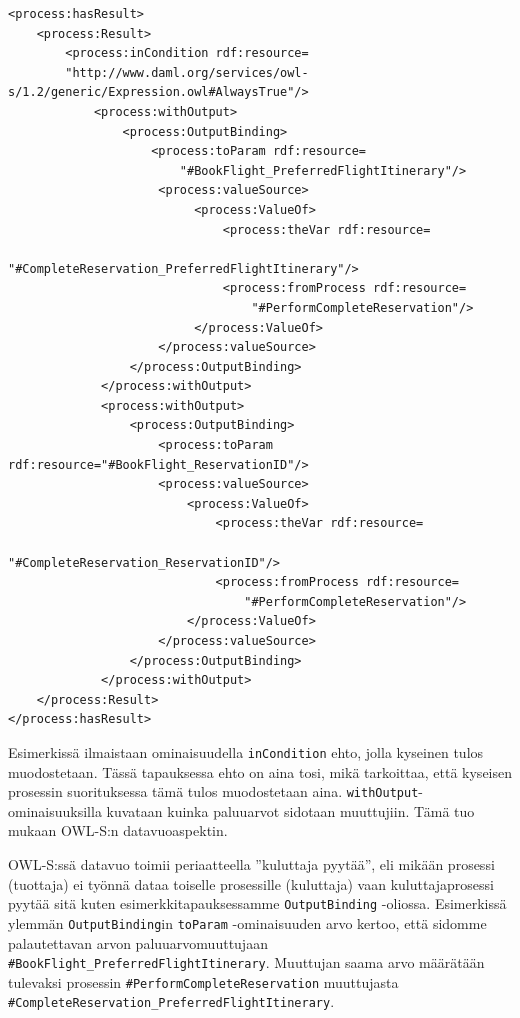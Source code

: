 \documentclass[finnish]{tktltiki2}
\theoremstyle{definition}
\theoremstyle{remark}
\begin{document}
\footnotesize
\begin{verbatim}
<process:hasResult>
    <process:Result>
        <process:inCondition rdf:resource=
        "http://www.daml.org/services/owl-s/1.2/generic/Expression.owl#AlwaysTrue"/>
            <process:withOutput>
                <process:OutputBinding>
                    <process:toParam rdf:resource=
                        "#BookFlight_PreferredFlightItinerary"/>
                     <process:valueSource>
                          <process:ValueOf>
                              <process:theVar rdf:resource=
                                  "#CompleteReservation_PreferredFlightItinerary"/>
                              <process:fromProcess rdf:resource=
                                  "#PerformCompleteReservation"/>
                          </process:ValueOf>
                     </process:valueSource>
                 </process:OutputBinding>
             </process:withOutput>
             <process:withOutput>
                 <process:OutputBinding>
                     <process:toParam rdf:resource="#BookFlight_ReservationID"/>
                     <process:valueSource>
                         <process:ValueOf>
                             <process:theVar rdf:resource=
                                 "#CompleteReservation_ReservationID"/>
                             <process:fromProcess rdf:resource=
                                 "#PerformCompleteReservation"/>
                         </process:ValueOf>
                     </process:valueSource>
                 </process:OutputBinding>
             </process:withOutput>
    </process:Result>
</process:hasResult>
\end{verbatim}

\normalsize


Esimerkissä ilmaistaan ominaisuudella \texttt{inCondition} ehto, jolla kyseinen tulos muodostetaan. Tässä tapauksessa ehto on aina tosi, mikä tarkoittaa, että kyseisen prosessin suorituksessa tämä tulos muodostetaan aina. \texttt{withOutput}-ominaisuuksilla kuvataan kuinka paluuarvot sidotaan muuttujiin. Tämä tuo mukaan OWL-S:n datavuoaspektin. 

OWL-S:ssä datavuo toimii periaatteella ''kuluttaja pyytää'', eli mikään prosessi (tuottaja) ei työnnä dataa toiselle prosessille (kuluttaja) vaan kuluttajaprosessi pyytää sitä kuten esimerkkitapauksessamme \texttt{OutputBinding} -oliossa. Esimerkissä ylemmän \texttt{OutputBinding}in \texttt{toParam} -ominaisuuden arvo kertoo, että sidomme palautettavan arvon paluuarvomuuttujaan \texttt{\#BookFlight\_PreferredFlightItinerary}. Muuttujan saama arvo määrätään tulevaksi prosessin  \texttt{\#PerformCompleteReservation} muuttujasta \texttt{\#CompleteReservation\_PreferredFlightItinerary}. 
\end{document}
